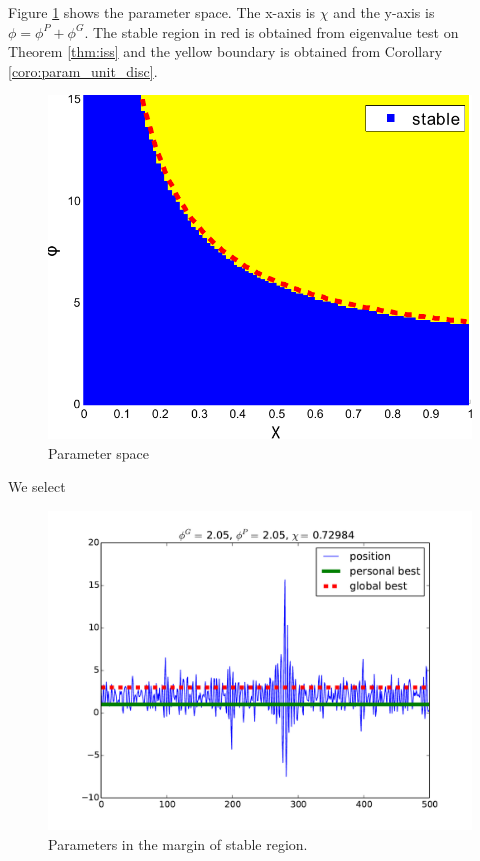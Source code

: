Figure \ref{fig:paramSpace} shows the parameter space.
The x-axis is $ \chi $ and the y-axis is $ \phi = \phi^{P} + \phi^{G} $.
The stable region in red is obtained from eigenvalue test on Theorem \ref{thm:iss} and the yellow boundary is obtained from Corollary \ref{coro:param_unit_disc}.
\begin{figure}
\centering
\includegraphics[width=0.9\linewidth]{./figure/param2}
\caption{Parameter space}
\label{fig:paramSpace}
\end{figure}

We select 

\begin{figure}
\centering
\includegraphics[width=\linewidth]{./figure/bound_case_1}
\caption{Parameters in the margin of stable region.}
\label{fig:bound_case:a}
\end{figure}

